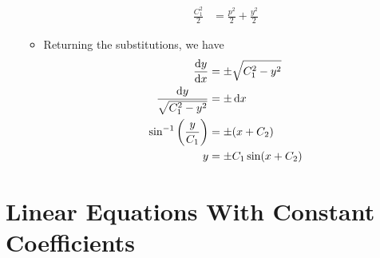 \documentclass[../main.tex]{subfiles}
\begin{document}
\begin{itemize}
\begin{itemize}
\begin{align*}
            \frac{C_1^2}{2} &= \frac{p^2}{2}+\frac{y^2}{2}
        \end{align*}
        \item Returning the substitutions, we have
        \begin{align*}
            \dv{y}{x} &= \pm\sqrt{C_1^2-y^2}\\
            \frac{\dd{y}}{\sqrt{C_1^2-y^2}} &= \pm\dd{x}\\
            \sin^{-1}\left( \frac{y}{C_1} \right) &= \pm(x+C_2)\\
            y &= \pm C_1\sin(x+C_2)
        \end{align*}
    \end{itemize}
\end{itemize}



\section{Linear Equations With Constant Coefficients}
\end{document}

